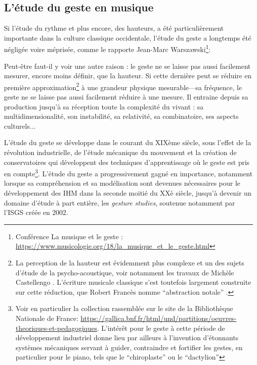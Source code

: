 \subsection{L'étude du geste en musique}

\noindent Si l'étude du rythme et plus encore, des hauteurs, a été particulièrement importante dans la culture classique occidentale, l'étude du geste a longtemps été négligée voire méprisée, comme le rapporte Jean-Marc Warszawski\footnote{Conférence La musique et le geste : \url{https://www.musicologie.org/18/la_musique_et_le_geste.html}}:


Peut-être faut-il y voir une autre raison : le geste ne se laisse pas aussi facilement mesurer, encore moins définir, que la hauteur. Si cette dernière peut se  réduire en première approximation\footnote{La perception de la hauteur est évidemment plus complexe et un des sujets d'étude de la psycho-acoustique, voir notamment les travaux de Michèle Castellengo \cite{castellengo_ecoute_2015}. L'écriture musicale classique s'est toutefois largement construite sur cette réduction, que Robert Francès nomme ``abstraction notale'' \cite{frances_perception_1984}.} à une grandeur physique mesurable—sa fréquence, le geste ne se laisse pas aussi facilement réduire à une mesure. Il entraine depuis sa production jusqu'à sa réception toute la complexité du vivant : sa multidimensionalité, son instabilité, sa relativité, sa combinatoire, ses aspects culturels...

L'étude du geste se développe dans le courant du XIXème siècle, sous l'effet de la révolution industrielle, de l'étude mécanique du mouvement et la création de conservatoires qui développent des techniques d'apprentissage où le geste est pris en compte\footnote{Voir en particulier la collection rassemblée sur le site de la Bibliothèque Nationale de France: \url{https://gallica.bnf.fr/html/und/partitions/oeuvres-theoriques-et-pedagogiques}. L'intérêt pour le geste à cette période de développement industriel donne lieu par ailleurs à l'invention d'étonnants systèmes mécaniques servant à guider, contraindre et fortifier les gestes, en particulier pour le piano, tels que le ``chiroplaste'' ou le ``dactylion''}. L'étude du geste a progressivement gagné en importance, notamment lorsque sa compréhension et sa modélisation sont devenues nécessaires pour le développement des \gls{IHM} dans la seconde moitié du XXè siècle, jusqu'à devenir un domaine d'étude à part entière, les \textit{gesture studies}, soutenue notamment par l'\gls{ISGS} créée en 2002.

